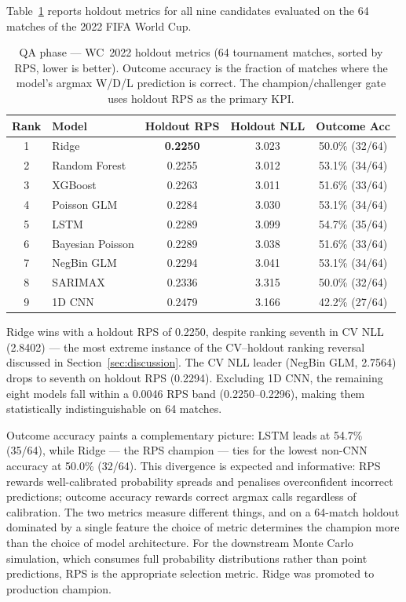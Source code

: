 \documentclass[conference]{IEEEtran}
\begin{document}
Table~\ref{tab:qa_results} reports holdout metrics for all nine candidates
evaluated on the 64 matches of the 2022 FIFA World Cup.

\begin{table}[h]
  \centering
  \caption{QA phase --- WC~2022 holdout metrics (64 tournament matches, sorted
  by RPS, lower is better).  Outcome accuracy is the fraction of matches where
  the model's argmax W/D/L prediction is correct.  The champion/challenger gate
  uses holdout RPS as the primary KPI.}
  \label{tab:qa_results}
  \begin{tabular}{clccc}
    \toprule
    Rank & Model & \footnotesize{Holdout RPS} & \footnotesize{Holdout NLL}
         & \footnotesize{Outcome Acc} \\
    \midrule
    1 & Ridge            & \textbf{0.2250} & 3.023 & 50.0\% (32/64) \\
    2 & Random Forest    & 0.2255 & 3.012 & 53.1\% (34/64) \\
    3 & XGBoost          & 0.2263 & 3.011 & 51.6\% (33/64) \\
    4 & Poisson GLM      & 0.2284 & 3.030 & 53.1\% (34/64) \\
    5 & LSTM             & 0.2289 & 3.099 & 54.7\% (35/64) \\
    6 & Bayesian Poisson & 0.2289 & 3.038 & 51.6\% (33/64) \\
    7 & NegBin GLM       & 0.2294 & 3.041 & 53.1\% (34/64) \\
    8 & SARIMAX          & 0.2336 & 3.315 & 50.0\% (32/64) \\
    9 & 1D CNN           & 0.2479 & 3.166 & 42.2\% (27/64) \\
    \bottomrule
  \end{tabular}
\end{table}

Ridge wins with a holdout RPS of 0.2250, despite ranking seventh in CV NLL
(2.8402) --- the most extreme instance of the CV--holdout ranking reversal
discussed in Section~\ref{sec:discussion}.  The CV NLL leader (NegBin GLM,
2.7564) drops to seventh on holdout RPS (0.2294).  Excluding 1D CNN, the
remaining eight models fall within a 0.0046 RPS band (0.2250--0.2296),
making them statistically indistinguishable on 64 matches.

Outcome accuracy paints a complementary picture: LSTM leads at 54.7\%
(35/64), while Ridge --- the RPS champion --- ties for the lowest non-CNN
accuracy at 50.0\% (32/64).  This divergence is expected and informative:
RPS rewards well-calibrated probability spreads and penalises overconfident
incorrect predictions; outcome accuracy rewards correct argmax calls
regardless of calibration.  The two metrics measure different things, and on
a 64-match holdout dominated by a single feature the choice of metric
determines the champion more than the choice of model architecture.  For the
downstream Monte Carlo simulation, which consumes full probability
distributions rather than point predictions, RPS is the appropriate selection
metric.  Ridge was promoted to production champion.
\end{document}
